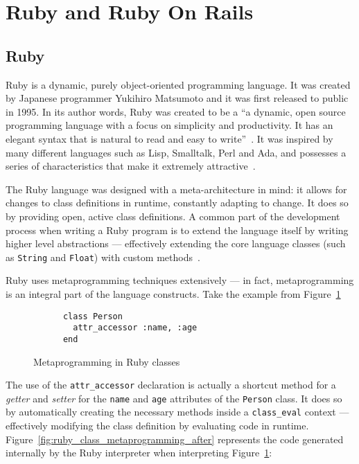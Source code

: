 \section{Ruby and Ruby On Rails}\label{sec:ruby_and_ror}

\subsection{Ruby}\label{sec:ruby}

Ruby is a dynamic, purely object-oriented programming language. It was created by Japanese programmer Yukihiro Matsumoto and it was first released to public in 1995. In its author words, Ruby was created to be a ``a dynamic, open source programming language with a focus on simplicity and productivity. It has an elegant syntax that is natural to read and easy to write''~\cite{ruby}. It was inspired by many different languages such as Lisp, Smalltalk, Perl and Ada, and possesses a series of characteristics that make it extremely attractive~\cite{ruby}.

The Ruby language was designed with a meta-architecture in mind: it allows for changes to class definitions in runtime, constantly adapting to change. It does so by providing open, active class definitions. A common part of the development process when writing a Ruby program is to extend the language itself by writing higher level abstractions --- effectively extending the core language classes (such as \verb!String! and \verb!Float!) with custom methods~\cite{metaprogramming_ruby}.

Ruby uses metaprogramming techniques extensively --- in fact, metaprogramming is an integral part of the language constructs. Take the example from Figure~\ref{fig:ruby_class_metaprogramming}

\begin{figure}[H]
  \centering
  \begin{minipage}{9cm}
    \begin{verbatim}
      class Person
        attr_accessor :name, :age
      end
    \end{verbatim}
  \end{minipage}
  \caption{Metaprogramming in Ruby classes}
  \label{fig:ruby_class_metaprogramming}
\end{figure}

The use of the \verb!attr_accessor! declaration is actually a shortcut method for a \emph{getter} and \emph{setter} for the \verb!name! and \verb!age! attributes of the \verb!Person! class. It does so by automatically creating the necessary methods inside a \verb!class_eval! context --- effectively modifying the class definition by evaluating code in runtime. Figure~\ref{fig:ruby_class_metaprogramming_after} represents the code generated internally by the Ruby interpreter when interpreting Figure~\ref{fig:ruby_class_metaprogramming}:


